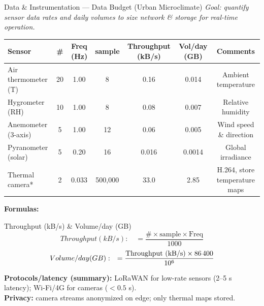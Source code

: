 \documentclass{beamer}
\begin{document}
\begin{frame}{Data \& Instrumentation — Data Budget (Urban Microclimate)}
\tiny
\setlength{\tabcolsep}{3pt}  
\textit{Goal: quantify sensor data rates and daily volumes to size network \& storage for real-time operation.}

\vspace{2mm}
\begin{tabular}{lcccccc}
\textbf{Sensor} & \textbf{\#} & \textbf{Freq (Hz)} & \textbf{sample} & \textbf{Throughput (kB/s)} & \textbf{Vol/day (GB)} & \textbf{Comments} \\
\hline
Air thermometer (T)   & 20 & 1.00  & 8        & 0.16  & 0.014 & Ambient temperature \\
Hygrometer (RH)       & 10 & 1.00  & 8        & 0.08  & 0.007 & Relative humidity \\
Anemometer (3-axis)   & 5  & 1.00  & 12       & 0.06  & 0.005 & Wind speed \& direction \\
Pyranometer (solar)   & 5  & 0.20  & 16       & 0.016 & 0.0014& Global irradiance \\
Thermal camera*       & 2  & 0.033 & 500{,}000& 33.0  & 2.85  & H.264, store temperature maps \\
\hline
\end{tabular}

\vspace{1mm}
\footnotesize
\textbf{Formulas:}
\begin{block}{Throughput (kB/s) \& Volume/day (GB)}
    $$Throughput (kB/s): \quad = \dfrac{\# \times \text{sample} \times \text{Freq}}{1000}$$
    $$ \noindent Volume/day (GB): \quad = \dfrac{\text{Throughput (kB/s)} \times 86\,400}{10^{6}}$$
\end{block}
\vspace{0.5mm}
\scriptsize
\textbf{Protocols/latency (summary):} LoRaWAN for low-rate sensors (2–5 s latency); Wi-Fi/4G for cameras ($<0.5$ s).  \\
\textbf{Privacy:} camera streams anonymized on edge; only thermal maps stored.
\end{frame}
\end{document}
